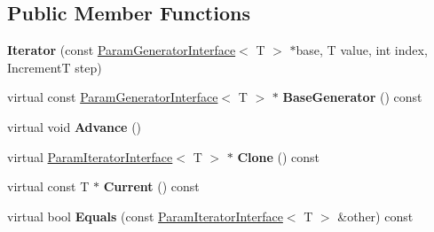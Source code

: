 \subsection*{Public Member Functions}
\begin{DoxyCompactItemize}
\item 
\mbox{\label{classtesting_1_1internal_1_1_range_generator_1_1_iterator_a960184d2ea0ff223d9cf4d6ab015baa8}} 
{\bfseries Iterator} (const \mbox{\hyperlink{classtesting_1_1internal_1_1_param_generator_interface}{Param\+Generator\+Interface}}$<$ T $>$ $\ast$base, T value, int index, IncrementT step)
\item 
\mbox{\label{classtesting_1_1internal_1_1_range_generator_1_1_iterator_a353a987e94e585294c22b76ad8b461a3}} 
virtual const \mbox{\hyperlink{classtesting_1_1internal_1_1_param_generator_interface}{Param\+Generator\+Interface}}$<$ T $>$ $\ast$ {\bfseries Base\+Generator} () const
\item 
\mbox{\label{classtesting_1_1internal_1_1_range_generator_1_1_iterator_a4a97adf3eafecc62a83dfb7cad1b27f0}} 
virtual void {\bfseries Advance} ()
\item 
\mbox{\label{classtesting_1_1internal_1_1_range_generator_1_1_iterator_aa3a5123fd8f2413e21dbb03327dceee0}} 
virtual \mbox{\hyperlink{classtesting_1_1internal_1_1_param_iterator_interface}{Param\+Iterator\+Interface}}$<$ T $>$ $\ast$ {\bfseries Clone} () const
\item 
\mbox{\label{classtesting_1_1internal_1_1_range_generator_1_1_iterator_a4a8d7908d5201913ba37b6bf2a6f9884}} 
virtual const T $\ast$ {\bfseries Current} () const
\item 
\mbox{\label{classtesting_1_1internal_1_1_range_generator_1_1_iterator_a2ae0f453be98bdcfffecc3c71c7a9879}} 
virtual bool {\bfseries Equals} (const \mbox{\hyperlink{classtesting_1_1internal_1_1_param_iterator_interface}{Param\+Iterator\+Interface}}$<$ T $>$ \&other) const
\end{DoxyCompactItemize}
